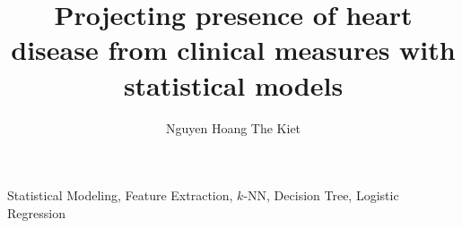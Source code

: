 \documentclass{ifacconf}
\begin{document}

\begin{frontmatter}

\title{Projecting presence of heart disease from clinical measures with statistical models}

\author{Nguyen Hoang The Kiet} 

\address{Bachelor Student in Data Science and Analytics, College of Humanities and Science, National University of Singapore (Email: e1375598@u.nus.edu).}



\begin{keyword}
Statistical Modeling, Feature Extraction, \( k \)-NN, Decision Tree, Logistic Regression
\end{keyword}

\end{frontmatter}







\nocite{*}
\setlength{\bibsep}{10pt}
  

\end{document}
